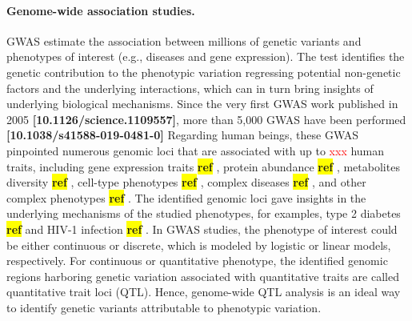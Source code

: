 \documentclass[12pt,usletter,fancy]{elegantbook}
\newcommand{\reqref}[1][ref]{
  \colorbox{yellow}{\textbf{#1}}
}
\begin{document}
\paragraph*{Genome-wide association studies.}
GWAS estimate the association between millions of genetic variants and phenotypes of interest (e.g., diseases and gene expression).
The test identifies the genetic contribution to the phenotypic variation regressing potential non-genetic factors and the underlying interactions, which can in turn bring insights of underlying biological mechanisms.
Since the very first GWAS work published in 2005 \textbf{[10.1126/science.1109557]}, more than 5,000 GWAS have been performed \textbf{[10.1038/s41588-019-0481-0]}
Regarding human beings, these GWAS pinpointed numerous genomic loci that are associated with up to \textcolor{red}{xxx} human traits, including gene expression traits\reqref, protein abundance\reqref, metabolites diversity\reqref, cell-type phenotypes\reqref, complex diseases\reqref, and other complex phenotypes\reqref.
The identified genomic loci gave insights in the underlying mechanisms of the studied phenotypes, for examples, type 2 diabetes\reqref and HIV-1 infection\reqref.
In GWAS studies, the phenotype of interest could be either continuous or discrete, which is modeled by logistic or linear models, respectively.
For continuous or quantitative phenotype, the identified genomic regions harboring genetic variation associated with quantitative traits are called quantitative trait loci (QTL).
Hence, genome-wide QTL analysis is an ideal way to identify genetic variants attributable to phenotypic variation.
\end{document}
